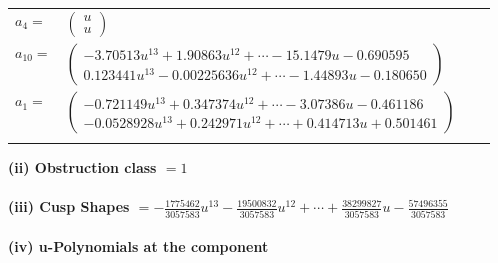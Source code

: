 \documentclass[1p]{elsarticle_modified}
\theoremstyle{definition}
\begin{document}
\begin{tabular}{m{7pt} m{180pt} m{7pt} m{180pt} }
\flushright $a_{4}=$&$\begin{pmatrix}u\\u\end{pmatrix}$ \\
\flushright $a_{10}=$&$\begin{pmatrix}-3.70513 u^{13}+1.90863 u^{12}+\cdots-15.1479 u-0.690595\\0.123441 u^{13}-0.00225636 u^{12}+\cdots-1.44893 u-0.180650\end{pmatrix}$ \\
\flushright $a_{1}=$&$\begin{pmatrix}-0.721149 u^{13}+0.347374 u^{12}+\cdots-3.07386 u-0.461186\\-0.0528928 u^{13}+0.242971 u^{12}+\cdots+0.414713 u+0.501461\end{pmatrix}$\\&\end{tabular}
\flushleft \textbf{(ii) Obstruction class $= 1$}\\~\\
\flushleft \textbf{(iii) Cusp Shapes $= -\frac{1775462}{3057583} u^{13}-\frac{19500832}{3057583} u^{12}+\cdots+\frac{38299827}{3057583} u-\frac{57496355}{3057583}$}\\~\\
\newpage\renewcommand{\arraystretch}{1}
\flushleft \textbf{(iv) u-Polynomials at the component}\newline \\
\end{document}
